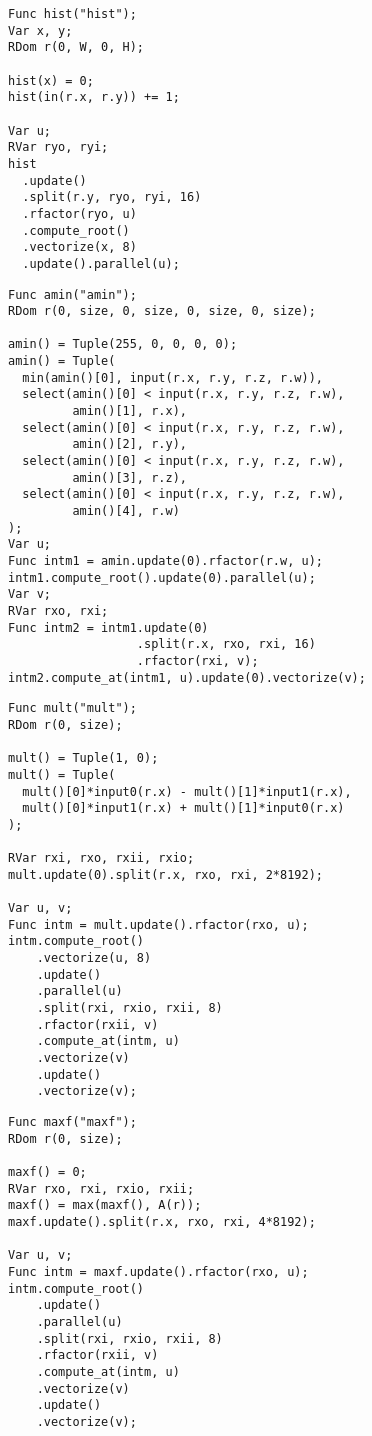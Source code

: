 \begin{lstlisting}[caption={Benchmark code for histogram of a two-dimensional image.}, label={lst:benchmark_histogram}]
Func hist("hist");
Var x, y;
RDom r(0, W, 0, H);

hist(x) = 0;
hist(in(r.x, r.y)) += 1;

Var u;
RVar ryo, ryi;
hist
  .update()
  .split(r.y, ryo, ryi, 16)
  .rfactor(ryo, u)
  .compute_root()
  .vectorize(x, 8)
  .update().parallel(u);
\end{lstlisting}

\begin{lstlisting}[caption={Benchmark code for argmin over 4D array}, label={lst:benchmark_argmin}]
Func amin("amin");
RDom r(0, size, 0, size, 0, size, 0, size);

amin() = Tuple(255, 0, 0, 0, 0);
amin() = Tuple(
  min(amin()[0], input(r.x, r.y, r.z, r.w)),
  select(amin()[0] < input(r.x, r.y, r.z, r.w), 
         amin()[1], r.x),
  select(amin()[0] < input(r.x, r.y, r.z, r.w), 
         amin()[2], r.y),
  select(amin()[0] < input(r.x, r.y, r.z, r.w), 
         amin()[3], r.z),
  select(amin()[0] < input(r.x, r.y, r.z, r.w), 
         amin()[4], r.w)
);
Var u;
Func intm1 = amin.update(0).rfactor(r.w, u);
intm1.compute_root().update(0).parallel(u);
Var v;
RVar rxo, rxi;
Func intm2 = intm1.update(0)
                  .split(r.x, rxo, rxi, 16)
                  .rfactor(rxi, v);
intm2.compute_at(intm1, u).update(0).vectorize(v);                   
\end{lstlisting}

\begin{lstlisting}[caption={Benchmark code for multiplication of complex number}, label={lst:benchmark_complex_multiply}]
Func mult("mult");
RDom r(0, size);

mult() = Tuple(1, 0);
mult() = Tuple(
  mult()[0]*input0(r.x) - mult()[1]*input1(r.x),
  mult()[0]*input1(r.x) + mult()[1]*input0(r.x)
);

RVar rxi, rxo, rxii, rxio;
mult.update(0).split(r.x, rxo, rxi, 2*8192);

Var u, v;
Func intm = mult.update().rfactor(rxo, u);
intm.compute_root()
    .vectorize(u, 8)
    .update()
    .parallel(u)
    .split(rxi, rxio, rxii, 8)
    .rfactor(rxii, v)
    .compute_at(intm, u)
    .vectorize(v)
    .update()
    .vectorize(v);
\end{lstlisting}

\begin{lstlisting}[caption={Benchmark code for finding the maximum value over 1D array}, label={lst:benchmark_max}]
Func maxf("maxf");
RDom r(0, size);

maxf() = 0;
RVar rxo, rxi, rxio, rxii;
maxf() = max(maxf(), A(r));
maxf.update().split(r.x, rxo, rxi, 4*8192);

Var u, v;
Func intm = maxf.update().rfactor(rxo, u);
intm.compute_root()
    .update()
    .parallel(u)
    .split(rxi, rxio, rxii, 8)
    .rfactor(rxii, v)
    .compute_at(intm, u)
    .vectorize(v)
    .update()
    .vectorize(v);
\end{lstlisting}

